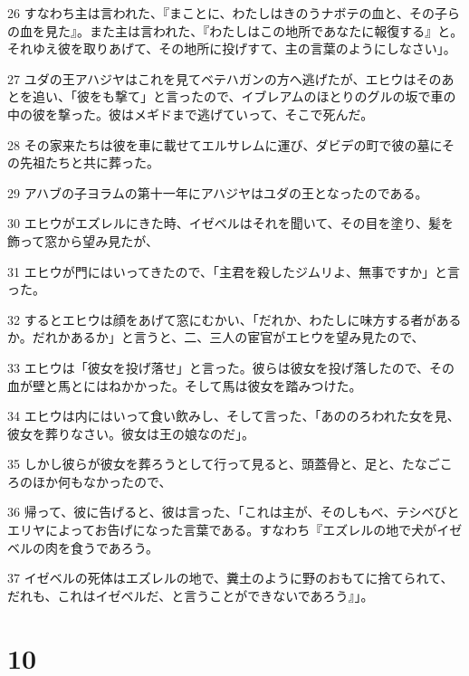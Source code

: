 \par 26 すなわち主は言われた、『まことに、わたしはきのうナボテの血と、その子らの血を見た』。また主は言われた、『わたしはこの地所であなたに報復する』と。それゆえ彼を取りあげて、その地所に投げすて、主の言葉のようにしなさい」。
\par 27 ユダの王アハジヤはこれを見てベテハガンの方へ逃げたが、エヒウはそのあとを追い、「彼をも撃て」と言ったので、イブレアムのほとりのグルの坂で車の中の彼を撃った。彼はメギドまで逃げていって、そこで死んだ。
\par 28 その家来たちは彼を車に載せてエルサレムに運び、ダビデの町で彼の墓にその先祖たちと共に葬った。
\par 29 アハブの子ヨラムの第十一年にアハジヤはユダの王となったのである。
\par 30 エヒウがエズレルにきた時、イゼベルはそれを聞いて、その目を塗り、髪を飾って窓から望み見たが、
\par 31 エヒウが門にはいってきたので、「主君を殺したジムリよ、無事ですか」と言った。
\par 32 するとエヒウは顔をあげて窓にむかい、「だれか、わたしに味方する者があるか。だれかあるか」と言うと、二、三人の宦官がエヒウを望み見たので、
\par 33 エヒウは「彼女を投げ落せ」と言った。彼らは彼女を投げ落したので、その血が壁と馬とにはねかかった。そして馬は彼女を踏みつけた。
\par 34 エヒウは内にはいって食い飲みし、そして言った、「あののろわれた女を見、彼女を葬りなさい。彼女は王の娘なのだ」。
\par 35 しかし彼らが彼女を葬ろうとして行って見ると、頭蓋骨と、足と、たなごころのほか何もなかったので、
\par 36 帰って、彼に告げると、彼は言った、「これは主が、そのしもべ、テシベびとエリヤによってお告げになった言葉である。すなわち『エズレルの地で犬がイゼベルの肉を食うであろう。
\par 37 イゼベルの死体はエズレルの地で、糞土のように野のおもてに捨てられて、だれも、これはイゼベルだ、と言うことができないであろう』」。

\chapter{10}

